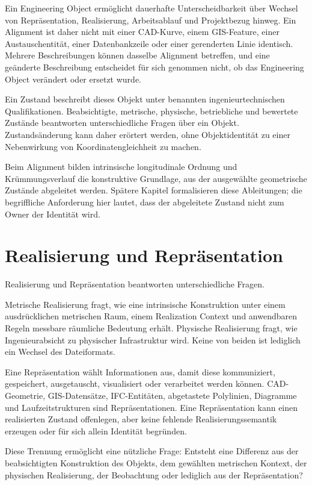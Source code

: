 Ein Engineering Object ermöglicht dauerhafte Unterscheidbarkeit über Wechsel
von Repräsentation, Realisierung, Arbeitsablauf und Projektbezug hinweg. Ein
Alignment ist daher nicht mit einer CAD-Kurve, einem GIS-Feature, einer
Austauschentität, einer Datenbankzeile oder einer gerenderten Linie identisch.
Mehrere Beschreibungen können dasselbe Alignment betreffen, und eine geänderte
Beschreibung entscheidet für sich genommen nicht, ob das Engineering Object
verändert oder ersetzt wurde.

Ein Zustand beschreibt dieses Objekt unter benannten ingenieurtechnischen
Qualifikationen. Beabsichtigte, metrische, physische, betriebliche und
bewertete Zustände beantworten unterschiedliche Fragen über ein Objekt.
Zustandsänderung kann daher erörtert werden, ohne Objektidentität zu einer
Nebenwirkung von Koordinatengleichheit zu machen.

Beim Alignment bilden intrinsische longitudinale Ordnung und
Krümmungsverlauf die konstruktive Grundlage, aus der ausgewählte geometrische
Zustände abgeleitet werden. Spätere Kapitel formalisieren diese Ableitungen;
die begriffliche Anforderung hier lautet, dass der abgeleitete Zustand nicht
zum Owner der Identität wird.

\section{Realisierung und Repräsentation}

Realisierung und Repräsentation beantworten unterschiedliche Fragen.

Metrische Realisierung fragt, wie eine intrinsische Konstruktion unter einem
ausdrücklichen metrischen Raum, einem Realization Context und anwendbaren
Regeln messbare räumliche Bedeutung erhält. Physische Realisierung fragt, wie
Ingenieurabsicht zu physischer Infrastruktur wird. Keine von beiden ist
lediglich ein Wechsel des Dateiformats.

Eine Repräsentation wählt Informationen aus, damit diese kommuniziert,
gespeichert, ausgetauscht, visualisiert oder verarbeitet werden können.
CAD-Geometrie, GIS-Datensätze, IFC-Entitäten, abgetastete Polylinien,
Diagramme und Laufzeitstrukturen sind Repräsentationen. Eine Repräsentation
kann einen realisierten Zustand offenlegen, aber keine fehlende
Realisierungssemantik erzeugen oder für sich allein Identität begründen.

Diese Trennung ermöglicht eine nützliche Frage: Entsteht eine Differenz aus
der beabsichtigten Konstruktion des Objekts, dem gewählten metrischen Kontext,
der physischen Realisierung, der Beobachtung oder lediglich aus der
Repräsentation?

